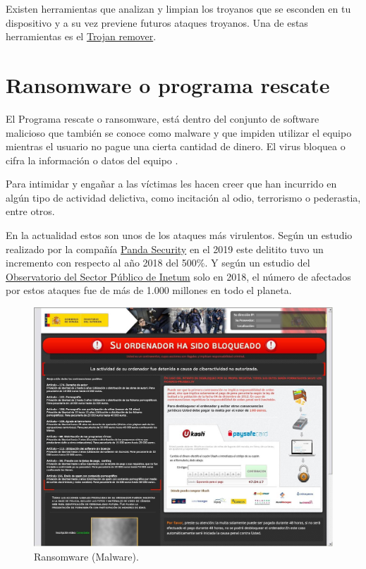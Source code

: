 \documentclass[
  spanish,
  a4paper,
  openany]{book}
\begin{document}
Existen herramientas que analizan y limpian los troyanos que se esconden en tu dispositivo y a su vez previene futuros ataques troyanos. Una de estas herramientas es el \href{https://www.avast.com/c-trojan-remover-tool}{Trojan remover}.

\hypertarget{ransomware-o-programa-rescate}{%
\section{Ransomware o programa rescate}\label{ransomware-o-programa-rescate}}

El Programa rescate o ransomware, está dentro del conjunto de software malicioso que también se conoce como malware y que impiden utilizar el equipo mientras el usuario no pague una cierta cantidad de dinero. El virus bloquea o cifra la información o datos del equipo \citep{WIKI-ransomware}.

Para intimidar y engañar a las víctimas les hacen creer que han incurrido en algún tipo de actividad delictiva, como incitación al odio, terrorismo o pederastia, entre otros.

En la actualidad estos son unos de los ataques más virulentos. Según un estudio realizado por la compañía \href{https://www.pandasecurity.com/es/mediacenter/seguridad/2019-tsunami-del-ransomware/}{Panda Security} en el 2019 este delitito tuvo un incremento con respecto al año 2018 del 500\%. Y según un estudio del \href{https://www.ospi.es/es/}{Observatorio del Sector Público de Inetum} solo en 2018, el número de afectados por estos ataques fue de más de 1.000 millones en todo el planeta.

\begin{figure}

{\centering \includegraphics[width=0.75\linewidth]{images/ransomware} 

}

\caption{Ransomware (Malware).}\label{fig:unnamed-chunk-15}
\end{figure}
\end{document}
